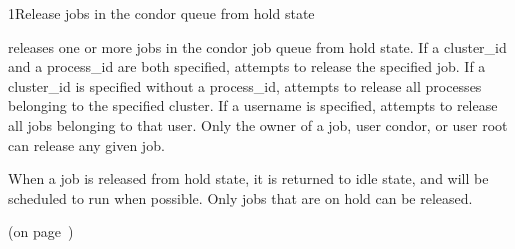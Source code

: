 \begin{ManPage}{}{1}{Release jobs in the condor queue from hold state}
\label{man-condor-release}
\Synopsis {}

\Description

 releases one or more jobs in the condor job queue from hold state.  If a
cluster\_id and a process\_id are both specified,  attempts to
release the specified job. If a cluster\_id is specified
without a process\_id,  attempts to release all processes belonging
to the specified cluster. If a username is specified,  attempts to
release all jobs belonging to that user. Only the owner of a job, user condor,
or user root can release any given job.

When a job is released from hold state, it is returned to idle state, and will be scheduled
to run when possible. Only jobs that are on hold can be released.

\begin{Options}
\end{Options}

\SeeAlso
{} (on page~\pageref{man-condor-hold})

\end{ManPage}
